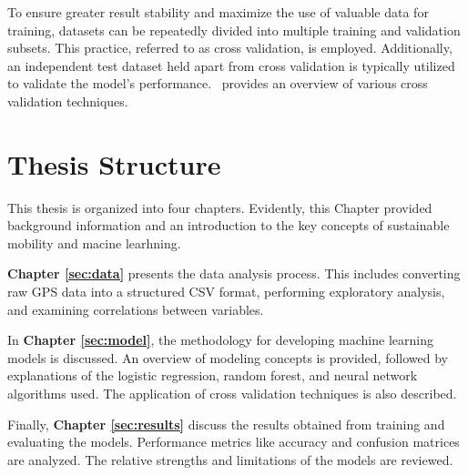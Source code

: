 To ensure greater result stability and maximize the use of valuable data for training, datasets can be repeatedly divided into multiple training and validation subsets. This practice, referred to as cross validation, is employed. Additionally, an independent test dataset held apart from cross validation is typically utilized to validate the model's performance.~\cite{browne2000cv} provides an overview of various cross validation techniques.

\section{Thesis Structure}
\label{sec:intro:structure}

This thesis is organized into four chapters. Evidently, this Chapter provided background information and an introduction to the key concepts of sustainable mobility and macine learhning. 

\textbf{Chapter \ref{sec:data}} presents the data analysis process. This includes converting raw GPS data into a structured CSV format, performing exploratory analysis, and examining correlations between variables.

In \textbf{Chapter \ref{sec:model}}, the methodology for developing machine learning models is discussed. An overview of modeling concepts is provided, followed by explanations of the logistic regression, random forest, and neural network algorithms used. The application of cross validation techniques is also described. 

Finally, \textbf{Chapter \ref{sec:results}} discuss the results obtained from training and evaluating the models. Performance metrics like accuracy and confusion matrices are analyzed. The relative strengths and limitations of the models are reviewed. 

